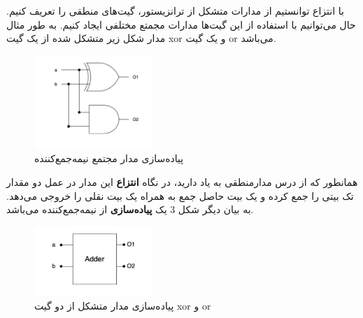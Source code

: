 \begin{flushright}
    با انتزاع توانستیم از مدارات متشکل از ترانزیستور، گیت‌های منطقی را تعریف کنیم.
    حال می‌توانیم با استفاده از این گیت‌ها مدارات مجمتع مختلفی ایجاد کنیم.
    به طور مثال مدار شکل زیر متشکل شده از یک گیت xor و یک گیت or می‌باشد.

    \begin{figure}[h]
        \centering
        \includegraphics[width= 0.4\textwidth]{source/half-adder-imp}
        \caption{پیاده‌سازی مدار مجتمع نیمه‌جمع‌کننده}
        \label{fig:half-adder-imp}
    \end{figure}

    همانطور که از درس مدارمنطقی به یاد دارید، در نگاه \textbf{انتزاع} این مدار در عمل دو مقدار تک بیتی را جمع کرده و یک بیت حاصل جمع به همراه یک بیت نقلی را خروجی می‌دهد.
    به بیان دیگر شکل 3 یک \textbf{پیاده‌سازی} از نیمه‌جمع‌کننده می‌باشد.

    \begin{figure}[h]
        \centering
        \includegraphics[width= 0.4\textwidth]{source/half-adder-abs}
        \caption{پیاده‌سازی مدار متشکل از دو گیت xor و or}
        \label{fig:half-adder-abs}
    \end{figure}

\end{flushright}